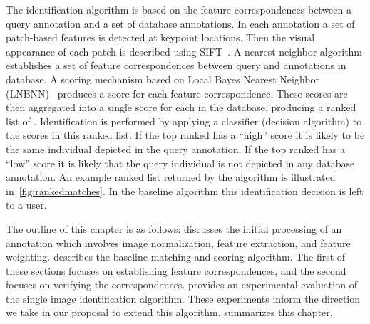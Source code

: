     The identification algorithm is based on the feature
      correspondences between a query annotation and a set of database
      annotations.
    In each annotation a set of patch-based features is detected at
      keypoint locations.
    Then the visual appearance of each patch is described using
      SIFT~\cite{lowe_distinctive_2004}.
    A nearest neighbor algorithm establishes a set of feature
      correspondences between query and annotations in database.
    A scoring mechanism based on Local \Naive{} Bayes Nearest Neighbor
      (LNBNN)~\cite{mccann_local_2012} produces a score for each feature
      correspondence.
    These scores are then aggregated into a single score for each
      \name{} in the database, producing a ranked list of \names{}.
    Identification is performed by applying a classifier (decision
      algorithm) to the scores in this ranked list.
    If the top ranked \name{} has a ``high'' score it is likely to be
      the same individual depicted in the query annotation.
    If the top ranked \name{} has a ``low'' score it is likely that the
      query individual is not depicted in any database annotation.
    An example ranked list returned by the algorithm is illustrated
      in~\cref{fig:rankedmatches}.
    In the baseline algorithm this identification decision is left to a
      user.

    The outline of this chapter is as follows:
     discusses the initial processing of an
      annotation which involves image normalization, feature extraction,
      and feature weighting.
     describes the baseline matching
      and scoring algorithm.
    The first of these sections focuses on establishing feature
      correspondences, and the second focuses on verifying the
      correspondences.
     provides an experimental evaluation of the
      single image identification algorithm.
    These experiments inform the direction we take in our proposal to
      extend this algorithm.
     summarizes this chapter.

    \rankedmatches{}

    
    
    
    
